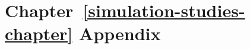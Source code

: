 \chapter{Chapter~\ref{simulation-studies-chapter} Appendix} \label{simulation-studies-appendix}

 

